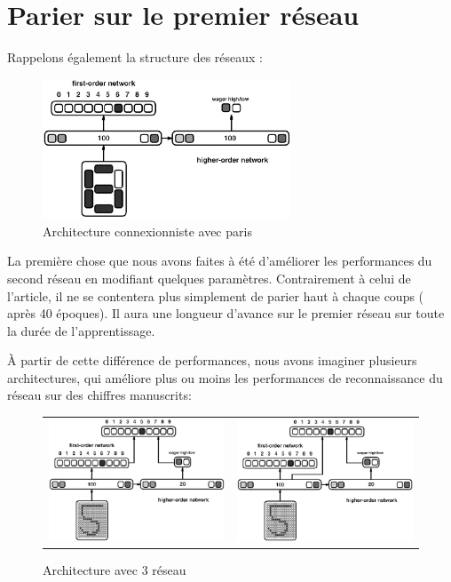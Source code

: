 \documentclass[a4paper,12pt]{article}
\begin{document}
\section{Parier sur le premier réseau}

Rappelons également la structure des réseaux :
\begin{figure}[h]
\begin{center}
 \includegraphics[width=280px]{../cleeremans_2007/digital_reco/schema.png}
\end{center}
 \caption{ \protect \footnotemark Architecture connexionniste avec paris  }
\end{figure}

La première chose que nous avons faites à été d'améliorer les performances du second réseau
en modifiant quelques paramètres. Contrairement à celui de l'article, il ne se contentera 
plus simplement de parier haut à chaque coups ( après 40 époques). Il aura une longueur d'avance
sur le premier réseau sur toute la durée de l'apprentissage.

À partir de cette différence de performances, nous avons imaginer plusieurs architectures, qui
améliore plus ou moins les performances de reconnaissance du réseau sur des chiffres manuscrits:

\begin{figure}[h]
 \begin{center}
\begin{tabular}{c|c}
 \includegraphics[width=210px]{../pre-presentation/thrid.png} & 
 \includegraphics[width=210px]{../pre-presentation/thrid_hidden.png}
\end{tabular}
\end{center}
\caption{Architecture avec 3 réseau}
\end{figure}
\end{document}
